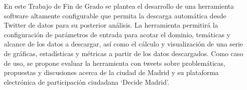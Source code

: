 En este Trabajo de Fin de Grado se plantea el desarrollo de una herramienta software altamente configurable que permita la descarga automática desde Twitter de datos para su posterior análisis. La herramienta permitirá la configuración de parámetros de entrada para acotar el dominio, temáticas y alcance de los datos a descargar, así como el cálculo y visualización de una serie de gráficas, estadísticas y métricas a partir de los datos descargados. Como caso de uso, se propone evaluar la herramienta con tweets sobre problemáticas, propuestas y discusiones acerca de la ciudad de Madrid y su plataforma electrónica de participación ciudadana ‘Decide Madrid’.